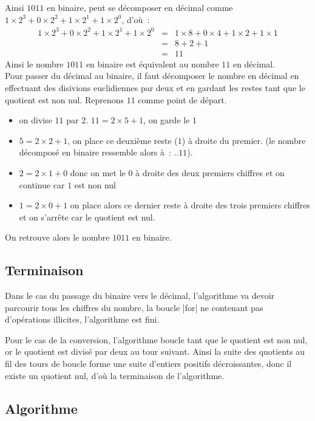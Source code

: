 		Ainsi $1011$ en binaire, peut se décomposer en décimal comme $1 \times 2^3 + 0 \times 2^2 + 1 \times 2^1 + 1 \times 2^0$, d'où~:
		\[ \begin{array}{rcl}
			1 \times 2^3 + 0 \times 2^2 + 1 \times 2^1 + 1 \times 2^0 & = & 1 \times 8 + 0 \times 4 + 1 \times 2 + 1 \times 1 \\
			& = & 8 + 2 + 1 \\
			& = & 11
		\end{array} \]
		Ainsi le nombre $1011$ en binaire est équivalent au nombre $11$ en décimal. \\
		
		Pour passer du décimal au binaire, il faut décomposer le nombre en décimal en effectuant des disivions euclidiennes par deux et en gardant les restes tant que le quotient est non nul. Reprenons $11$ comme point de départ.
		\begin{itemize}
			\item on divise $11$ par $2$. $11 = 2 \times 5 + 1$, on garde le $1$
			\item $5 = 2 \times 2 + 1$, on place ce deuxième reste ($1$) à droite du premier. (le nombre décomposé en binaire ressemble alors à~: $..11$).
			\item $2 = 2 \times 1 + 0$ donc on met le $0$ à droite des deux premiers chiffres et on continue car $1$ est non nul
			\item $1 = 2 \times 0 + 1$ on place alors ce dernier reste à droite des trois premiers chiffres et on s'arrête car le quotient est nul.
		\end{itemize}
		
		On retrouve alors le nombre $1011$ en binaire.

	\subsection{Terminaison}
		
		Dans le cas du passage du binaire vers le décimal, l'algorithme va devoir parcourir tous les chiffres du nombre, la boucle \python|for| ne contenant pas d'opérations illicites, l'algorithme est fini.
		
		Pour le cas de la conversion, l'algorithme boucle tant que le quotient est non nul, or le quotient est divisé par deux au tour suivant. Ainsi la suite des quotients au fil des tours de boucle forme une suite d'entiers positifs décroissantes, donc il existe un quotient nul, d'où la terminaison de l'algorithme.
	
	\subsection{Algorithme}
		

